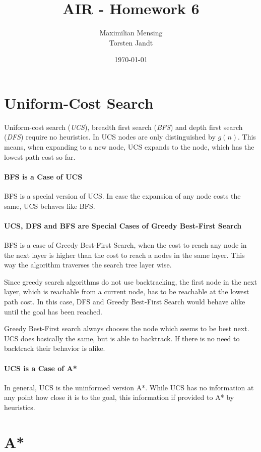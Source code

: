 \documentclass[a4paper,headsepline,12pt]{scrartcl}
\title{AIR - Homework 6}
\date{\today}
\author{Maximilian Mensing\\Torsten Jandt}
\begin{document}
\maketitle{}
\section{Uniform-Cost Search}
Uniform-cost search (\emph{UCS}), breadth first search (\emph{BFS}) and depth first search (\emph{DFS}) require no heuristics. In UCS nodes are only distinguished by \( g(n)\). This means, when expanding to a new node, UCS expands to the node, which has the lowest path cost so far.
\paragraph{BFS is a Case of UCS}
BFS is a special version of UCS. In case the expansion of any node costs the same, UCS behaves like BFS.

\paragraph{UCS, DFS and BFS are Special Cases of Greedy Best-First Search}
BFS is a case of Greedy Best-First Search, when the cost to reach any node in the next layer is higher than the cost to reach a nodes in the same layer. This way the algorithm traverses the search tree layer wise. 

Since greedy search algorithms do not use backtracking, the first node in the next layer, which is reachable from a current node, has to be reachable at the lowest path cost. In this case, DFS and  Greedy Best-First Search would behave alike until the goal has been reached. 

Greedy  Best-First search always chooses the node which seems to be best next. UCS does basically the same, but is able to backtrack. If there is no need to backtrack their behavior is alike.
\paragraph{UCS is a Case of A*}
In general, UCS is the uninformed version A*. While UCS has no information at any point how close it is to the goal, this information if provided to A* by heuristics.

\newpage
\section{A*}
\end{document}
